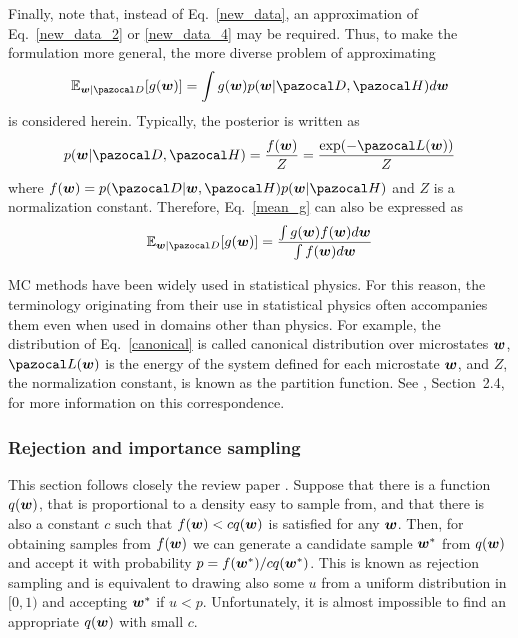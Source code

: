 Finally, note that, instead of Eq.~\eqref{new_data}, an approximation of Eq.~\eqref{new_data_2} or \eqref{new_data_4} may be required. 
Thus, to make the formulation more general, the more diverse problem of approximating 
\begin{equation}\label{mean_g}
	\mathbb{E}_{\bw|\cD}[g(\bw)] = \int g(\bw)p(\bw|\cD,\cH)d\bw
\end{equation}
is considered herein. 
Typically, the posterior is written as
\begin{equation}\label{canonical}
p(\bw|\cD,\cH) = \frac{f(\bw)}{Z} = \frac{\exp(-\cL(\bw))}{Z}
\end{equation}
where $f(\bw) = p(\cD|\bw,\cH)p(\bw|\cH)$ and $Z$ is a normalization constant. 
Therefore, Eq.~\eqref{mean_g} can also be expressed as
\begin{equation}\label{mean_g_2}
\mathbb{E}_{\bw|\cD}[g(\bw)] = \frac{\int g(\bw)f(\bw)d\bw}{\int f(\bw)d\bw}
\end{equation}

MC methods have been widely used in statistical physics. 
For this reason, the terminology originating from their use in statistical physics often accompanies them even when used in domains other than physics. 
For example, the distribution of Eq.~\eqref{canonical} is called canonical distribution over microstates $\boldsymbol{w}$, $\cL(\bw)$ is the energy of the system defined for each microstate $\boldsymbol{w}$, and $Z$, the normalization constant, is known as the partition function. 
See \textcite{neal1993probabilistic}, Section~2.4, for more information on this correspondence.

\subsubsection{Rejection and importance sampling}
This section follows closely the review paper \textcite{neal1993probabilistic}.
Suppose that there is a function $q(\boldsymbol{w})$, that is proportional to a density easy to sample from, and that there is also a constant $c$ such that $f(\boldsymbol{w})<c q(\boldsymbol{w})$ is satisfied for any $\boldsymbol{w}$.
Then, for obtaining samples from $f(\boldsymbol{w})$ we can generate a candidate sample $\boldsymbol{w}^*$ from $q(\boldsymbol{w})$ and accept it with probability $p=f(\boldsymbol{w}^*)/cq(\boldsymbol{w}^*)$. 
This is known as rejection sampling and is equivalent to drawing also some $u$ from a uniform distribution in $[0,1)$ and accepting $\boldsymbol{w}^*$ if $u<p$.
Unfortunately, it is almost impossible to find an appropriate $q(\boldsymbol{w})$ with small $c$.

